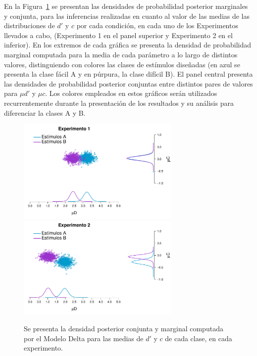 En la Figura~\ref{fig:Delta_Joints} se presentan las densidades de probabilidad posterior marginales y conjunta, para las inferencias realizadas en cuanto al valor de las medias de las distribuciones de $d'$ y $c$ por cada condición, en cada uno de los Experimentos llevados a cabo, (Experimento 1 en el panel superior y Experimento 2 en el inferior). En los extremos de cada gráfica se presenta la densidad de probabilidad marginal computada para la media de cada parámetro a lo largo de distintos valores, distinguiendo con colores las clases de estímulos diseñadas (en azul se presenta la clase fácil A y en púrpura, la clase difícil B). El panel central presenta las densidades de probabilidad posterior conjuntas entre distintos pares de valores para $\mu d'$ y $\mu c$. Los colores empleados en estos gráficos serán utilizados recurrentemente durante la presentación de los resultados y su análisis para diferenciar la clases A y B.\\ 

\begin{figure}[th]
\centering
\includegraphics[width=0.7\textwidth]{Figures/MDelta_Joint_E1}\\
\includegraphics[width=0.7\textwidth]{Figures/MDelta_Joint_E2}\\
\caption[Modelo Delta: Distribuciones posteriores marginales y conjuntas para $\mu d'$ y $\mu c$ por cada clase de estímulo]{Se presenta la densidad posterior conjunta y marginal computada por el Modelo Delta para las medias de $d'$ y $c$ de cada clase, en cada experimento.}
\label{fig:Delta_Joints}
\end{figure}

